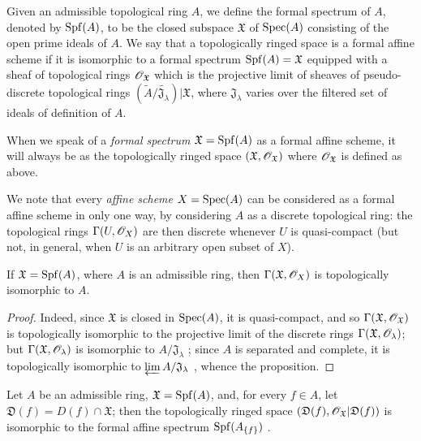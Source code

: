 \begin{definition}[10.1.2]
\label{I.10.1.2}
Given an admissible topological ring $A$, we define the formal spectrum of $A$, denoted by $\operatorname{Spf}(A)$, to be the closed subspace $\mathfrak{X}$ of $\operatorname{Spec}(A)$ consisting of the open prime ideals of $A$.
We say that a topologically ringed space is a formal affine scheme if it is isomorphic to a formal spectrum $\operatorname{Spf}(A)=\mathfrak{X}$ equipped with a sheaf of topological rings $\mathscr{O}_\mathfrak{X}$ which is the projective limit of sheaves of pseudo-discrete topological rings $(\widetilde{A}/\widetilde{\mathfrak{J}_\lambda})|\mathfrak{X}$, where $\mathfrak{J}_\lambda$ varies over the filtered set of ideals of definition of $A$.
\end{definition}

When we speak of a \emph{formal spectrum $\mathfrak{X}=\operatorname{Spf}(A)$} as a formal affine scheme, it will always be as the topologically ringed space $(\mathfrak{X},\mathscr{O}_\mathfrak{X})$ where $\mathscr{O}_\mathfrak{X}$ is defined as above.

We note that every \emph{affine scheme} $X=\operatorname{Spec}(A)$ can be considered as a formal affine scheme in only one way, by considering $A$ as a discrete topological ring: the topological rings $\Gamma(U,\mathscr{O}_X)$ are then discrete whenever $U$ is quasi-compact (but not, in general, when $U$ is an arbitrary open subset of $X$).

\begin{proposition}[10.1.3]
\label{I.10.1.3}
If $\mathfrak{X}=\operatorname{Spf}(A)$, where $A$ is an admissible ring, then $\Gamma(\mathfrak{X},\mathscr{O}_X)$ is topologically isomorphic to $A$.
\end{proposition}

\begin{proof}
Indeed, since $\mathfrak{X}$ is closed in $\operatorname{Spec}(A)$, it is quasi-compact, and so $\Gamma(\mathfrak{X},\mathscr{O}_\mathfrak{X})$ is topologically isomorphic to the projective limit of the discrete rings $\Gamma(\mathfrak{X},\mathscr{O}_\lambda)$; but $\Gamma(\mathfrak{X},\mathscr{O}_\lambda)$ is isomorphic to $A/\mathfrak{J}_\lambda$ ; since $A$ is separated and complete, it is topologically isomorphic to $\varprojlim A/\mathfrak{J}_\lambda$ , whence the proposition.
\end{proof}

\begin{proposition}[10.1.4]
\label{I.10.1.4}
Let $A$ be an admissible ring, $\mathfrak{X}=\operatorname{Spf}(A)$, and, for every $f\in A$, let $\mathfrak{D}(f)=D(f)\cap\mathfrak{X}$; then the topologically ringed space $(\mathfrak{D}(f),\mathscr{O}_\mathfrak{X}|\mathfrak{D}(f))$ is isomorphic to the formal affine spectrum $\operatorname{Spf}(A_{\{f\}})$ .
\end{proposition}

